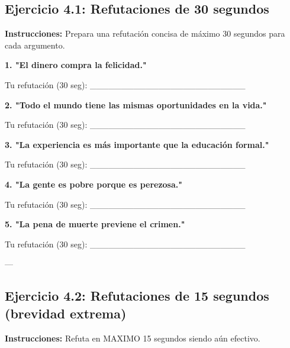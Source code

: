 \documentclass[a4paper,11pt]{article}
\begin{document}
\subsection{Ejercicio 4.1: Refutaciones de 30 segundos}

\vspace{0.2cm}

\textbf{Instrucciones:} Prepara una refutación concisa de máximo 30 segundos para cada argumento.

\vspace{0.2cm}

\textbf{1. "El dinero compra la felicidad."}

Tu refutación (30 seg): _________________________

\vspace{0.2cm}

\textbf{2. "Todo el mundo tiene las mismas oportunidades en la vida."}

Tu refutación (30 seg): _________________________

\vspace{0.2cm}

\textbf{3. "La experiencia es más importante que la educación formal."}

Tu refutación (30 seg): _________________________

\vspace{0.2cm}

\textbf{4. "La gente es pobre porque es perezosa."}

Tu refutación (30 seg): _________________________

\vspace{0.2cm}

\textbf{5. "La pena de muerte previene el crimen."}

Tu refutación (30 seg): _________________________

\vspace{0.2cm}

---

\vspace{0.2cm}

\subsection{Ejercicio 4.2: Refutaciones de 15 segundos (brevidad extrema)}

\vspace{0.2cm}

\textbf{Instrucciones:} Refuta en MAXIMO 15 segundos siendo aún efectivo.
\end{document}
